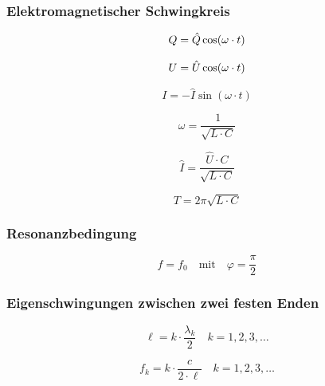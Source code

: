 \subsubsection{Elektromagnetischer Schwingkreis}
\begin{equation}\label{eq:elektromagnetischer:schwingkreis:ladung}
Q = \hat{Q}\cos(\omega \cdot t)\\
\end{equation}

\begin{equation}\label{eq:elektromagnetischer:schwingkreis:spannung}
U = \hat{U}\cos(\omega \cdot t)\\
\end{equation}

\begin{equation}\label{eq:elektromagnetischer:schwingkreis:stromstaerke}
I = - \hat{I}\sin(\omega \cdot t)
\end{equation}

\begin{equation}\label{eq:elektromagnetischer:schwingkreis:winkelgeschwindigkeit}
\omega = \frac{1}{\sqrt{L \cdot C}}
\end{equation}

\begin{equation}\label{eq:elektromagnetischer:schwingkreis:maximale:stromstaerke}
\hat{I} = \frac{\hat{U} \cdot C}{\sqrt{L \cdot C}}
\end{equation}

\begin{equation}\label{eq:elektromagnetischer:schwingkreis:periodendauer}
T = 2\pi \sqrt{L \cdot C}
\end{equation}

\subsubsection{Resonanzbedingung}
\begin{equation}\label{eq:resonanzbedingung}
f = f_0 \quad\text{mit}\quad \varphi = \frac{\pi}{2}
\end{equation}

\subsubsection{Eigenschwingungen zwischen zwei festen Enden}
\begin{equation}\label{eq:eigenschwingung:laengen}
\ell = k \cdot \frac{\lambda_k}{2} \quad k = 1, 2, 3,\ldots
\end{equation}

\begin{equation}\label{eq:eigenschwingung:frequenzen}
f_k = k \cdot \frac{c}{2 \cdot \ell} \quad k = 1, 2, 3,\ldots
\end{equation}